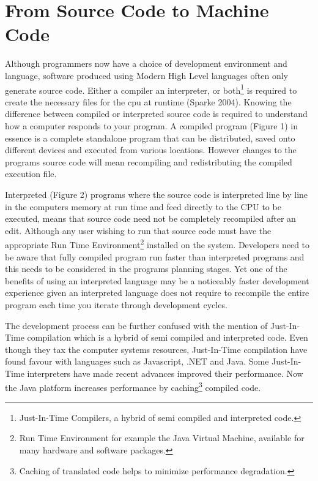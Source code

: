 \documentclass[a4paper]{article}
\begin{document}
\section*{From Source Code to Machine Code}
Although programmers now have a choice of  development environment and language, software produced using Modern High Level languages often only generate source code. Either a compiler an interpreter, or both\footnote{Just-In-Time Compilers, a hybrid of semi compiled and interpreted code.} is required to create the necessary files for the cpu at runtime (Sparke 2004). Knowing the difference between compiled or interpreted source code is required to understand how a computer responds to your program. A compiled program (Figure 1) in essence is a complete standalone program that can be distributed, saved onto different devices and executed from various locations. However changes to the programs source code will mean recompiling and redistributing the compiled execution file.

Interpreted (Figure 2) programs where the source code is interpreted line by line in the computers memory at run time and feed directly to the CPU to be executed, means that source code need not be completely recompiled after an edit. Although any user wishing to run that source code must have the appropriate Run Time Environment\footnote{Run Time Environment for example the Java Virtual Machine, available for many hardware and software packages.} installed on the system. Developers need to be aware that fully compiled program run faster than interpreted programs and this needs to be considered in the programs planning stages. Yet one of the benefits of using an interpreted language may be a noticeably faster development experience given an interpreted language does not require to recompile the entire program each time you iterate through development cycles. 

The development process can be further confused with the mention of Just-In-Time compilation which is a hybrid of semi compiled and interpreted code. Even though they tax the computer systems resources, Just-In-Time compilation have found favour with languages such as Javascript, .NET and Java. Some Just-In-Time interpreters have made recent advances improved their performance. Now the Java platform increases performance by caching\footnote{Caching of translated code helps to minimize performance degradation.} compiled code.
\end{document}
